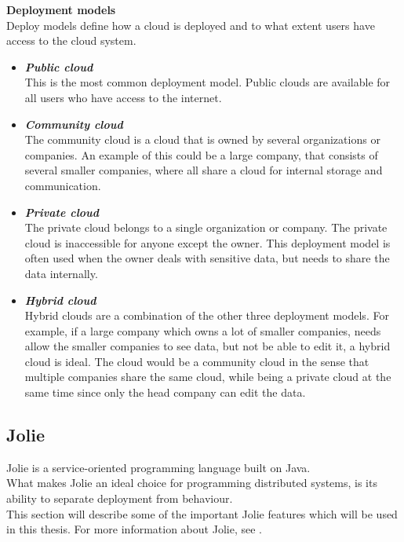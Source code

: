\documentclass[12pt,a4paper]{article}
\begin{document}
\textbf{Deployment models}\\
Deploy models define how a cloud is deployed and to what extent users have access to the cloud system.
\begin{itemize}
\item \textbf{\emph{Public cloud}} \\
This is the most common deployment model. Public clouds are available for all users who have access to the internet.

\item \textbf{\emph{Community cloud}} \\
The community cloud is a cloud that is owned by several organizations or companies. An example of this could be a large company, that consists of several smaller companies, where all share a cloud for internal storage and communication.

\item \textbf{\emph{Private cloud}} \\
The private cloud belongs to a single organization or company. The private cloud is inaccessible for anyone except the owner. This deployment model is often used when the owner deals with sensitive data, but needs to share the data internally.

\item \textbf{\emph{Hybrid cloud}} \\
Hybrid clouds are a combination of the other three deployment models. For example, if a large company which owns a lot of smaller companies, needs allow the smaller companies to see data, but not be able to edit it, a hybrid cloud is ideal. The cloud would be a community cloud in the sense that multiple companies share the same cloud, while being a private cloud at the same time since only the head company can edit the data.
\end{itemize}

\newpage
\subsection{Jolie}\label{subsec:Jolie}
Jolie is a service-oriented programming language built on Java. \\
What makes Jolie an ideal choice for programming distributed systems, is its ability to separate deployment from behaviour. \\
This section will describe some of the important Jolie features which will be used in this thesis. For more information about Jolie, see \cite{jolie_website}. \\
\end{document}
